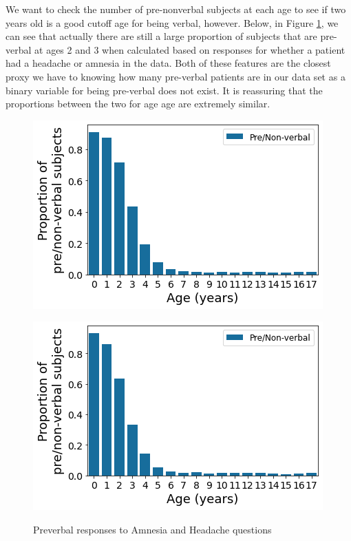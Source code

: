 \documentclass[11pt, letterpaper]{amsart}
\begin{document}
We want to check the number of pre-nonverbal subjects at each age to see if two years old is a good cutoff age for being verbal, however. Below, in Figure \ref{fig:preverbal}, we can see that actually there are still a large proportion of subjects that are pre-verbal at ages 2 and 3 when calculated based on responses for whether a patient had a headache or amnesia in the data. Both of these features are the closest proxy we have to knowing how many pre-verbal patients are in our data set as a binary variable for being pre-verbal does not exist. It is reassuring that the proportions between the two for age age are extremely similar.
\begin{figure}
	\begin{minipage}[b]{0.5\linewidth}
		\centering
		\includegraphics[width=\textwidth]{amnesia_preverbal.png}
		\label{fig:amnesia_preverbal}
	\end{minipage}%
	\begin{minipage}[b]{0.5\linewidth}
		\centering
		\includegraphics[width=\textwidth]{headache_preverbal.png}
		\label{fig:headache_preverbal}
	\end{minipage}
	\caption{Preverbal responses to Amnesia and Headache questions}\label{fig:preverbal}
\end{figure}
\end{document}
